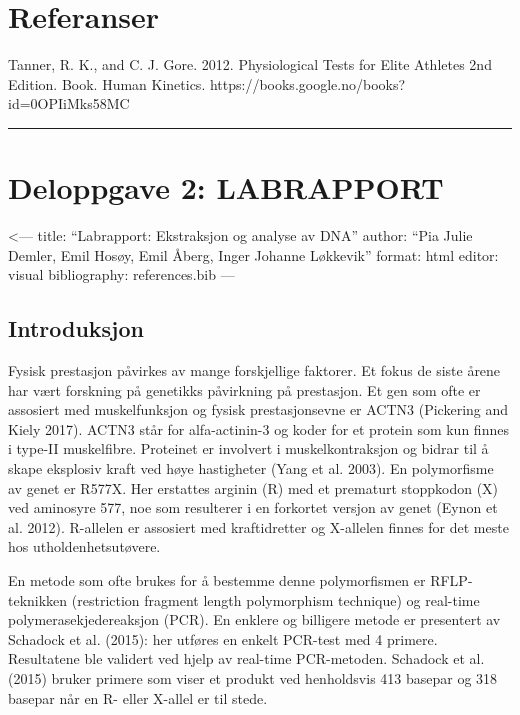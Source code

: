 \documentclass[
  letterpaper,
  DIV=11,
  numbers=noendperiod]{scrreprt}
\begin{document}

\hypertarget{referanser}{%
\chapter{Referanser}\label{referanser}}

Tanner, R. K., and C. J. Gore. 2012. Physiological Tests for Elite
Athletes 2nd Edition. Book. Human Kinetics.
https://books.google.no/books?id=0OPIiMks58MC

\begin{center}\rule{0.5\linewidth}{0.5pt}\end{center}


\hypertarget{deloppgave-2-labrapport}{%
\chapter{Deloppgave 2: LABRAPPORT}\label{deloppgave-2-labrapport}}

\textless--- title: ``Labrapport: Ekstraksjon og analyse av DNA''
author: ``Pia Julie Demler, Emil Hosøy, Emil Åberg, Inger Johanne
Løkkevik'' format: html editor: visual bibliography: references.bib ---

\hypertarget{introduksjon}{%
\section{\texorpdfstring{\textbf{Introduksjon}}{Introduksjon}}\label{introduksjon}}

Fysisk prestasjon påvirkes av mange forskjellige faktorer. Et fokus de
siste årene har vært forskning på genetikks påvirkning på prestasjon. Et
gen som ofte er assosiert med muskelfunksjon og fysisk prestasjonsevne
er ACTN3 (Pickering and Kiely 2017). ACTN3 står for alfa-actinin-3 og
koder for et protein som kun finnes i type-II muskelfibre. Proteinet er
involvert i muskelkontraksjon og bidrar til å skape eksplosiv kraft ved
høye hastigheter (Yang et al. 2003). En polymorfisme av genet er R577X.
Her erstattes arginin (R) med et prematurt stoppkodon (X) ved aminosyre
577, noe som resulterer i en forkortet versjon av genet (Eynon et al.
2012). R-allelen er assosiert med kraftidretter og X-allelen finnes for
det meste hos utholdenhetsutøvere.

En metode som ofte brukes for å bestemme denne polymorfismen er
RFLP-teknikken (restriction fragment length polymorphism technique) og
real-time polymerasekjedereaksjon (PCR). En enklere og billigere metode
er presentert av Schadock et al. (2015): her utføres en enkelt PCR-test
med 4 primere. Resultatene ble validert ved hjelp av real-time
PCR-metoden. Schadock et al. (2015) bruker primere som viser et produkt
ved henholdsvis 413 basepar og 318 basepar når en R- eller X-allel er
til stede.
\end{document}
